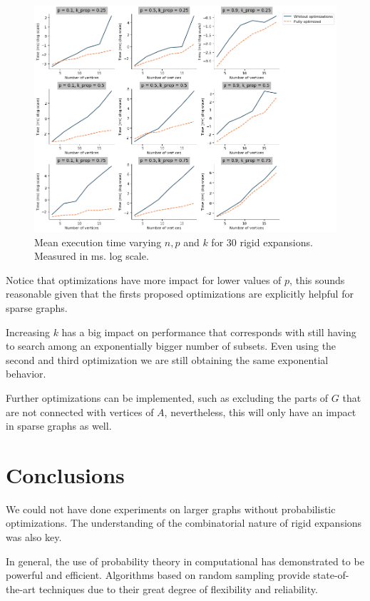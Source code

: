 \begin{figure}[h!]
	\centering
	\includegraphics[scale=0.45]{Python/Figures/Time-execution-rigid-expansions-log-scale.png}
	\caption{Mean execution time varying $n, p$ and $k$ for 30 rigid expansions. Measured in ms. log scale.}
	\label{fig:executionTimesRigidExpansionLog}
\end{figure}

Notice that optimizations have more impact for lower values of $p$, this sounds reasonable given that the firsts proposed optimizations are explicitly helpful for sparse graphs. 

Increasing $k$ has a big impact on performance that corresponds with still having to search among an exponentially bigger number of subsets. Even using the second and third optimization we are still obtaining the same exponential behavior.

Further optimizations can be implemented, such as excluding the parts of $G$ that are not connected with vertices of $A$, nevertheless, this will only have an impact in sparse graphs as well.

\section{Conclusions}

We could not have done experiments on larger graphs without probabilistic optimizations. The understanding of the combinatorial nature of rigid expansions was also key.

In general, the use of probability theory in computational has demonstrated to be powerful and efficient. Algorithms based on random sampling provide state-of-the-art techniques due to their great degree of flexibility and reliability. 

